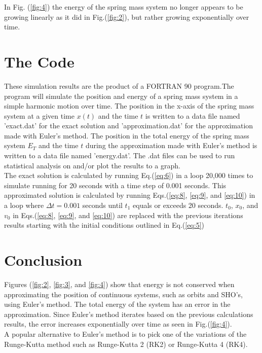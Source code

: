\documentclass{article}
\begin{document}
\noindent
In Fig. (\ref{fig:4}) the energy of the spring mass system no longer appears to be growing linearly as it did in Fig.(\ref{fig:2}), but rather growing exponentially over time.

\pagebreak
\section{The Code}
These simulation results are the product of a FORTRAN 90 program.The program will simulate the position and energy of a spring mass system in a simple harmonic motion  over time. The position in the x-axis of the spring mass system at a given time $x(t)$ and the time $t$ is written to a data file named 'exact.dat' for the exact solution and 'approximation.dat' for the approximation made with Euler's method. The position in the total energy of the spring mass system $E_T$ and the time $t$ during the approximation made with Euler's method is written to a data file named 'energy.dat'. The .dat files can be used to run statistical analysis on and/or plot the results to a graph.\\

\noindent
The exact solution is calculated by running Eq.(\ref{eq:6}) in a loop 20,000 times to simulate running for 20 seconds with a time step of 0.001 seconds. This approximated solution is calculated by running Eqs.(\ref{eq:8}, \ref{eq:9}, and \ref{eq:10}) in a loop where $\Delta t = 0.001$ seconds until $t_1$ equals or exceeds 20 seconds. $t_0$, $x_0$, and $v_0$ in Eqs.(\ref{eq:8}, \ref{eq:9}, and \ref{eq:10}) are replaced with the previous iterations results starting with the initial conditions outlined in Eq.(\ref{eq:5})

\section{Conclusion}
Figures (\ref{fig:2}, \ref{fig:3}, and \ref{fig:4}) show that energy is not conserved when approximating the position of continuous systems, such as orbits and SHO's, using Euler's method. The total energy of the system has an error in the approximation. Since Euler's method iterates based on the previous calculations results, the error increases exponentially over time as seen in Fig.(\ref{fig:4}).\\

\noindent
A popular alternative to Euler's method is to pick one of the variations of the Runge-Kutta method such as Runge-Kutta 2 (RK2) or Runge-Kutta 4 (RK4).
\end{document}
